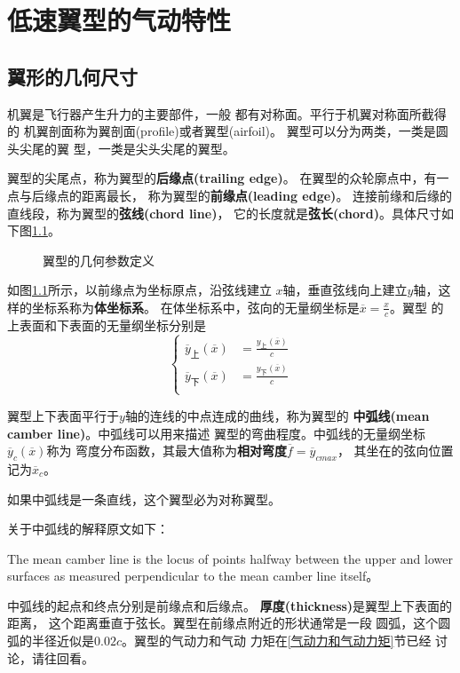 
\chapter{低速翼型的气动特性}
\section{翼形的几何尺寸}
机翼是飞行器产生升力的主要部件，一般
都有对称面。平行于机翼对称面所截得的
机翼剖面称为翼剖面(profile)或者翼型(airfoil)。
翼型可以分为两类，一类是圆头尖尾的翼
型，一类是尖头尖尾的翼型。

翼型的尖尾点，称为翼型的{\bfseries 后缘点(trailing edge)}。
在翼型的众轮廓点中，有一点与后缘点的距离最长，
称为翼型的{\bfseries 前缘点(leading edge)}。
连接前缘和后缘的直线段，称为翼型的{\bfseries 弦线(chord line)}，
它的长度就是{\bfseries 弦长(chord)}。具体尺寸如下图\ref{fig:profile}。
\begin{figure}[!ht]
	\center
	
	\caption{翼型的几何参数定义}
	\label{fig:profile}
\end{figure}
如图\ref{fig:profile}所示，以前缘点为坐标原点，沿弦线建立
$x$轴，垂直弦线向上建立$y$轴，这样的坐标系称为{\bfseries 体坐标系}。
在体坐标系中，弦向的无量纲坐标是$\overline{x}=\frac{x}{c}$。翼型
的上表面和下表面的无量纲坐标分别是
\begin{equation*}
	\begin{cases}
		\overline{y}_上(\overline{x}) & =\frac{y_上(\overline{x})}{c} \\
		\overline{y}_下(\overline{x}) & =\frac{y_下(\overline{x})}{c} \\
	\end{cases}
\end{equation*}

翼型上下表面平行于$y$轴的连线的中点连成的曲线，称为翼型的
{\bfseries 中弧线(mean camber line)}。中弧线可以用来描述
翼型的弯曲程度。中弧线的无量纲坐标$\overline{y}_c(\overline{x})$称为
弯度分布函数，其最大值称为{\bfseries 相对弯度}$\overline{f}=\overline{y}_{cmax}$，
其坐在的弦向位置记为$\overline{x}_c$。
\begin{note}
	如果中弧线是一条直线，这个翼型必为对称翼型。
\end{note}
\begin{notice}
	关于中弧线的解释原文如下：

	The mean camber line is the
	locus of points halfway between the upper and lower surfaces as measured perpendicular
	to the mean camber line itself。
\end{notice}
中弧线的起点和终点分别是前缘点和后缘点。
{\bfseries 厚度(thickness)}是翼型上下表面的距离，
这个距离垂直于弦长。翼型在前缘点附近的形状通常是一段
圆弧，这个圆弧的半径近似是$0.02c$。翼型的气动力和气动
力矩在{\color{titleblue}\ref{气动力和气动力矩}}节已经
讨论，请往回看。

